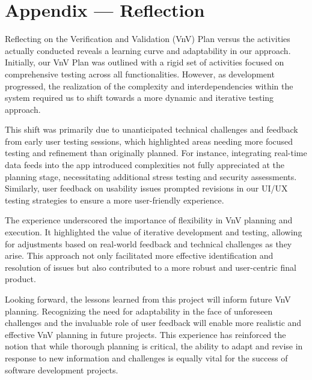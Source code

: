 \documentclass[12pt, titlepage]{article}
\begin{document}



\newpage{}
\section*{Appendix --- Reflection}

Reflecting on the Verification and Validation (VnV) Plan versus the activities actually conducted reveals a learning curve and adaptability in our approach. Initially, our VnV Plan was outlined with a rigid set of activities focused on comprehensive testing across all functionalities. However, as development progressed, the realization of the complexity and interdependencies within the system required us to shift towards a more dynamic and iterative testing approach.

This shift was primarily due to unanticipated technical challenges and feedback from early user testing sessions, which highlighted areas needing more focused testing and refinement than originally planned. For instance, integrating real-time data feeds into the app introduced complexities not fully appreciated at the planning stage, necessitating additional stress testing and security assessments. Similarly, user feedback on usability issues prompted revisions in our UI/UX testing strategies to ensure a more user-friendly experience.

The experience underscored the importance of flexibility in VnV planning and execution. It highlighted the value of iterative development and testing, allowing for adjustments based on real-world feedback and technical challenges as they arise. This approach not only facilitated more effective identification and resolution of issues but also contributed to a more robust and user-centric final product.

Looking forward, the lessons learned from this project will inform future VnV planning. Recognizing the need for adaptability in the face of unforeseen challenges and the invaluable role of user feedback will enable more realistic and effective VnV planning in future projects. This experience has reinforced the notion that while thorough planning is critical, the ability to adapt and revise in response to new information and challenges is equally vital for the success of software development projects.
\end{document}
